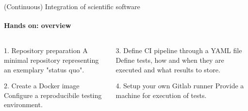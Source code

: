 \begin{frame}{(Continuous) Integration of scientific software}
    \framesubtitle{Hands on: overview}
    \begin{columns}
    \begin{column}{0.48\textwidth}
        \begin{block}{1. Repository preparation}
            A minimal repository representing an exemplary
            "status quo".
        \end{block}
        \begin{exampleblock}{2. Create a Docker image}
            Configure a reproducibile testing environment.
        \end{exampleblock}
    \end{column}

    \begin{column}{0.48\textwidth}
        \begin{block}{3. Define CI pipeline through a YAML file}
            Define tests, how and when they are executed and what
            results to store.
        \end{block}
        \begin{block}{4. Setup your own Gitlab runner}
            Provide a machine for execution of tests.
        \end{block}
    \end{column}
    \end{columns}
\end{frame}


